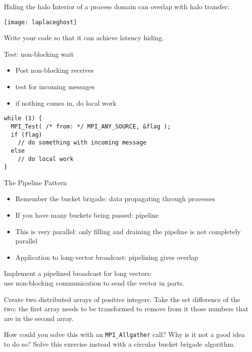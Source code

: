 \begin{numberedframe}{Hiding the halo}
  Interior of a process domain can overlap with halo transfer:

  \texttt{[image: laplaceghost]}
\end{numberedframe}

\begin{exerciseframe}[isendirecvarray]
  

  Write your code so that it can achieve latency hiding.
\end{exerciseframe}

\begin{numberedframe}{Test: non-blocking wait}
  \begin{itemize}
  \item Post non-blocking receives
  \item test for incoming messages
  \item if nothing comes in, do local work
  \end{itemize}
\lstset{language=C}
\begin{lstlisting}
while (1) {
  MPI_Test( /* from: */ MPI_ANY_SOURCE, &flag );
  if (flag)
    // do something with incoming message
  else
    // do local work
}
\end{lstlisting}
\end{numberedframe}

\begin{numberedframe}{The Pipeline Pattern}
  \begin{itemize}
  \item Remember the bucket brigade: data propagating through
    processes
  \item If you have many buckets being passed: pipeline
  \item This is very parallel: only filling and draining the pipeline
    is not completely parallel
  \item Application to long-vector broadcast: pipelining gives overlap
  \end{itemize}
\end{numberedframe}

\begin{optexerciseframe}[bucketpipenonblock]
  Implement a pipelined broadcast for long vectors:\\
  use non-blocking communication to send the vector in parts.
\end{optexerciseframe}

\begin{exerciseframe}[setdiff]
  Create two distributed arrays of positive integers.
  Take the set difference of the two:
  the first array needs to be transformed to remove from it those numbers
  that are in the second array.

  How could you solve this with an \lstinline+MPI_Allgather+ call?
  Why is it not a good idea to do so?
  Solve this exercise instead with a circular bucket brigade algorithm.
\end{exerciseframe}

